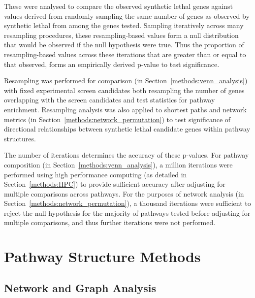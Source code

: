 These were analysed to compare the observed synthetic lethal genes against values derived from randomly sampling the same number of genes as observed by synthetic lethal from among the genes tested. Sampling iteratively across many resampling procedures, these resampling-based values form a null distribution that would be observed if the null hypothesis were true. Thus the proportion of resampling-based values across these iterations that are greater than or equal to that observed, forms an empirically derived p-value to test significance.

Resampling was performed for comparison (in Section~\ref{methods:venn_analysis}) with fixed experimental screen candidates \citep{Telford2015} both resampling the number of genes overlapping with the screen candidates and test statistics for pathway enrichment. Resampling analysis was also applied to shortest paths and network metrics (in Section~\ref{methods:network_permutation}) to test significance of directional relationships between synthetic lethal candidate genes within pathway structures.

The number of iterations determines the accuracy of these p-values. For pathway composition (in Section~\ref{methods:venn_analysis}), a million iterations were performed using high performance computing (as detailed in Section~\ref{methods:HPC}) to provide sufficient accuracy after adjusting for multiple comparisons across pathways. For the purposes of network analysis (in Section~\ref{methods:network_permutation}), a thousand iterations were sufficient to reject the null hypothesis for the majority of pathways tested before adjusting for multiple comparisons, and thus further iterations were not performed.

\section{Pathway Structure Methods}

\subsection{Network and Graph Analysis}

